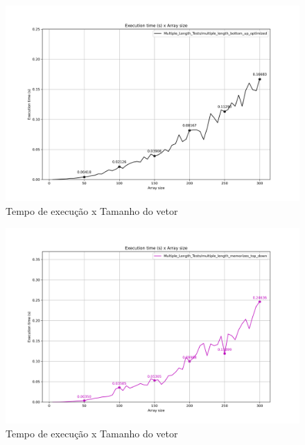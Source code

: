 \documentclass{article}
\begin{document}
\begin{figure} [H]
    \centering
    \caption{Tempo de execução x Tamanho do vetor}
    \includegraphics[width=1\textwidth]{images/multiple_length_bottom_up_optimized.png}
\end{figure}

\begin{figure} [H]
    \centering
    \caption{Tempo de execução x Tamanho do vetor}
    \includegraphics[width=1\textwidth]{images/multiple_length_memorizes_top_down.png}
\end{figure}
\end{document}
